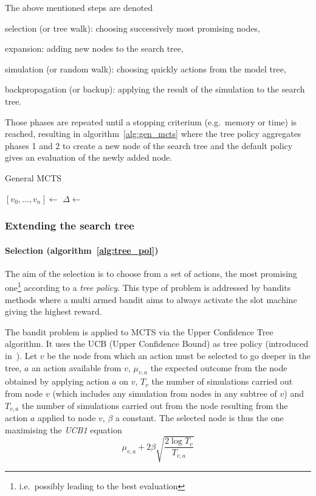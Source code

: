 \documentclass[twoside,twocolumn]{article}
\begin{document}
The above mentioned steps are denoted
\begin{compactenum}
\item selection (or tree walk): choosing successively most promising nodes,
\item expansion: adding new nodes to the search tree,
\item simulation (or random walk): choosing quickly actions from the model
  tree,
\item backpropagation (or backup): applying the result of the simulation to
  the search tree.
\end{compactenum}
Those phases are repeated until a stopping criterium (e.g.\ memory or time) is
reached, resulting in algorithm~\ref{alg:gen_mcts} where the tree policy
aggregates phases 1 and 2 to create a new node of the search tree and the
default policy gives an evaluation of the newly added node.
\begin{algorithm}
  \caption{General MCTS~\cite{browne2012survey}}\label{alg:gen_mcts}
  \begin{algorithmic}
    \State{} \([v_0, \dots, v_n] \gets\) 
    \State{} \(\Delta \gets\) 
    \State{} 
    \EndWhile{}
    \EndProcedure{}
  \end{algorithmic}
\end{algorithm}

\subsubsection{Extending the search tree}
\paragraph{Selection (algorithm~\ref{alg:tree_pol})}
The aim of the selection is to choose from a set of actions, the most promising
one\footnote{i.e.\ possibly leading to the best evaluation} according to a
\emph{tree policy}. This type of problem is addressed by bandits methods where
a multi armed bandit aims to always activate the slot machine giving the highest
reward.

The bandit problem is applied to MCTS via the Upper Confidence Tree algorithm.
It uses the UCB (Upper Confidence Bound) as tree policy (introduced
in~\cite{kocsis2006bandit}). Let \(v\) be the node from which an action must be
selected to go deeper in the tree, \(a\) an action available from \(v\),
\(\mu_{v,a}\) the expected outcome from the node obtained by applying action
\(a\) on \(v\), \(T_v\) the number of simulations carried out from node \(v\)
(which includes any simulation from nodes in any subtree of \(v\)) and
\(T_{v,a}\) the number of simulations carried out from the node resulting from
the action \(a\) applied to node \(v\), \(\beta\) a constant. The selected node
is thus the one maximising the \emph{UCB1} equation
\begin{equation}
  \mu_{v,a} + 2 \beta \sqrt{\frac{2 \log T_v}{T_{v,a}}}
\end{equation}
\end{document}
